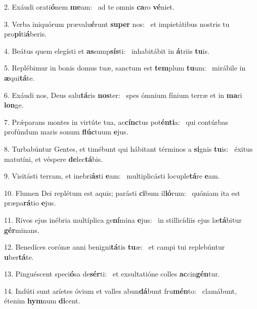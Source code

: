 2. Exáudi orati\textbf{ó}nem \textbf{me}am: \ast\  ad te omnis \textbf{ca}ro \textbf{vé}niet.\

3. Verba iniquórum prævalu\textbf{é}runt \textbf{su}\textbf{per} nos: \ast\  et impietátibus nostris tu pro\textbf{pi}ti\textbf{á}beris.\

4. Beátus quem elegísti et \textbf{as}sump\textbf{sís}ti: \ast\  inhabitábit in \textbf{á}triis \textbf{tu}is.\

5. Replébimur in bonis domus tuæ, sanctum est \textbf{tem}plum \textbf{tu}um: \ast\  mirábile in \textbf{æ}qui\textbf{tá}te.\

6. Exáudi nos, Deus salu\textbf{tá}ris \textbf{nos}ter: \ast\  spes ómnium fínium terræ et in \textbf{ma}ri \textbf{lon}ge.\

7. Prǽparans montes in virtúte tua, ac\textbf{cínc}tus pot\textbf{én}\textbf{ti}a: \ast\  qui contúrbas profúndum maris sonum \textbf{flúc}tuum \textbf{e}jus.\

8. Turbabúntur Gentes, et timébunt qui hábitant términos a \textbf{si}gnis \textbf{tu}is: \ast\  éxitus matutíni, et véspere \textbf{de}lec\textbf{tá}bis.\

9. Visitásti terram, et inebri\textbf{ás}ti \textbf{e}am: \ast\  multiplicásti locuple\textbf{tá}re \textbf{e}am.\

10. Flumen Dei replétum est aquis; parásti \textbf{ci}bum il\textbf{ló}rum: \ast\  quóniam ita est præpa\textbf{rá}tio \textbf{e}jus.\

11. Rivos ejus inébria multíplica ge\textbf{ní}mina \textbf{e}jus: \ast\  in stillicídiis ejus læ\textbf{tá}bitur \textbf{gér}minans.\

12. Benedíces corónæ anni benigni\textbf{tá}tis \textbf{tu}æ: \ast\  et campi tui replebúntur \textbf{u}ber\textbf{tá}te.\

13. Pinguéscent speci\textbf{ó}sa de\textbf{sér}ti: \ast\  et exsultatióne colles \textbf{ac}cin\textbf{gén}tur.\

14. Indúti sunt aríetes óvium et valles abun\textbf{dá}bunt fru\textbf{mén}to: \ast\  clamábunt, étenim \textbf{hym}num \textbf{di}cent.\

